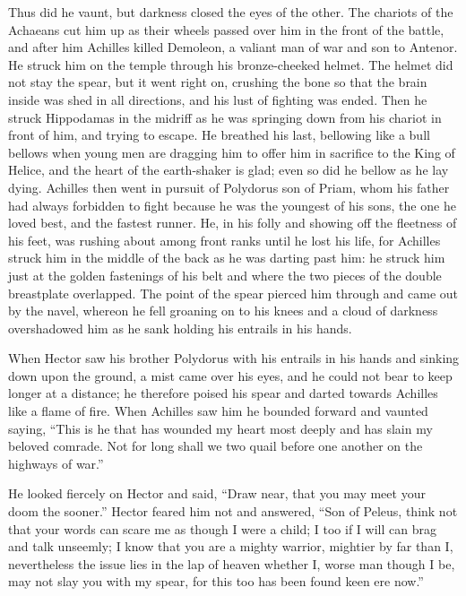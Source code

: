 Thus did he vaunt, but darkness closed the eyes of the other. The chariots
of the Achaeans cut him up as their wheels passed over him in the front of
the battle, and after him Achilles killed Demoleon, a valiant man of war
and son to Antenor. He struck him on the temple through his bronze-cheeked
helmet. The helmet did not stay the spear, but it went right on, crushing
the bone so that the brain inside was shed in all directions, and his lust
of fighting was ended. Then he struck Hippodamas in the midriff as he was
springing down from his chariot in front of him, and trying to escape. He
breathed his last, bellowing like a bull bellows when young men are
dragging him to offer him in sacrifice to the King of Helice, and the
heart of the earth-shaker is glad; even so did he bellow as he lay dying.
Achilles then went in pursuit of Polydorus son of Priam, whom his father
had always forbidden to fight because he was the youngest of his sons, the
one he loved best, and the fastest runner. He, in his folly and showing
off the fleetness of his feet, was rushing about among front ranks until
he lost his life, for Achilles struck him in the middle of the back as he
was darting past him: he struck him just at the golden fastenings of his
belt and where the two pieces of the double breastplate overlapped. The
point of the spear pierced him through and came out by the navel, whereon
he fell groaning on to his knees and a cloud of darkness overshadowed him
as he sank holding his entrails in his hands.

When Hector saw his brother Polydorus with his entrails in his hands and
sinking down upon the ground, a mist came over his eyes, and he could not
bear to keep longer at a distance; he therefore poised his spear and
darted towards Achilles like a flame of fire. When Achilles saw him he
bounded forward and vaunted saying, “This is he that has wounded my heart
most deeply and has slain my beloved comrade. Not for long shall we two
quail before one another on the highways of war.”

He looked fiercely on Hector and said, “Draw near, that you may meet your
doom the sooner.” Hector feared him not and answered, “Son of Peleus,
think not that your words can scare me as though I were a child; I too if
I will can brag and talk unseemly; I know that you are a mighty warrior,
mightier by far than I, nevertheless the issue lies in the lap of heaven
whether I, worse man though I be, may not slay you with my spear, for this
too has been found keen ere now.”

